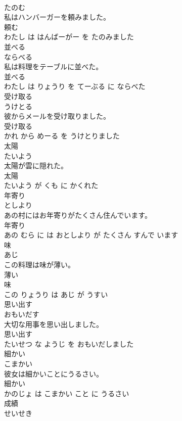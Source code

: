 \documentclass[8pt]{extreport}
\begin{document}
\begin{CJK}{UTF8}{min}
\\	たのむ			
\\	私はハンバーガーを頼みました。	
\\	頼む 
\\	わたし は はんばーがー を たのみました			
\\	並べる	
\\	ならべる			
\\	私は料理をテーブルに並べた。	
\\	並べる 
\\	わたし は りょうり を てーぶる に ならべた			
\\	受け取る	
\\	うけとる			
\\	彼からメールを受け取りました。	
\\	受け取る 
\\	かれ から めーる を うけとりました			
\\	太陽	
\\	たいよう			
\\	太陽が雲に隠れた。	
\\	太陽 
\\	たいよう が くも に かくれた			
\\	年寄り	
\\	としより			
\\	あの村にはお年寄りがたくさん住んでいます。	
\\	年寄り 
\\	あの むら に は おとしより が たくさん すんで います			
\\	味	
\\	あじ			
\\	この料理は味が薄い。	
\\	薄い 
\\	味 
\\	この りょうり は あじ が うすい			
\\	思い出す	
\\	おもいだす			
\\	大切な用事を思い出しました。	
\\	思い出す 
\\	たいせつ な ようじ を おもいだしました			
\\	細かい	
\\	こまかい			
\\	彼女は細かいことにうるさい。	
\\	細かい 
\\	かのじょ は こまかい こと に うるさい			
\\	成績	
\\	せいせき			

\end{CJK}
\end{document}
